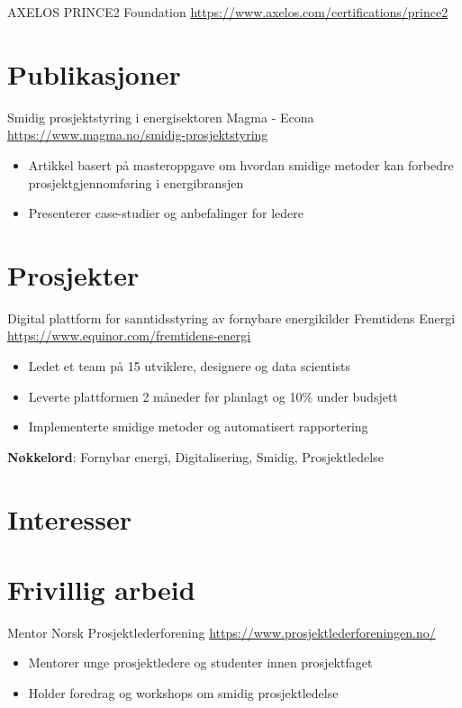 \documentclass[a4paper, serif, 10pt]{moderncv}
\begin{document}
        {AXELOS}
        {PRINCE2 Foundation}
        {\url{https://www.axelos.com/certifications/prince2}}
        {}
        {}
\section{Publikasjoner}

        {Smidig prosjektstyring i energisektoren}
        {Magma - Econa}
        {\url{https://www.magma.no/smidig-prosjektstyring}}
        {}
        {\begin{itemize}
\item Artikkel basert på masteroppgave om hvordan smidige metoder kan forbedre prosjektgjennomføring i energibransjen
\item Presenterer case-studier og anbefalinger for ledere
\end{itemize}}
\section{Prosjekter}

        {Digital plattform for sanntidsstyring av fornybare energikilder}
        {Fremtidens Energi}
        {\url{https://www.equinor.com/fremtidens-energi}}
        {}
        {\begin{itemize}
\item Ledet et team på 15 utviklere, designere og data scientists
\item Leverte plattformen 2 måneder før planlagt og 10\% under budsjett
\item Implementerte smidige metoder og automatisert rapportering
\end{itemize}
\textbf{Nøkkelord}: Fornybar energi, Digitalisering, Smidig, Prosjektledelse}
\section{Interesser}

\section{Frivillig arbeid}

        {Mentor}
        {Norsk Prosjektlederforening}
        {\url{https://www.prosjektlederforeningen.no/}}
        {}
        {\begin{itemize}
\item Mentorer unge prosjektledere og studenter innen prosjektfaget
\item Holder foredrag og workshops om smidig prosjektledelse
\end{itemize}}
    
\end{document}
